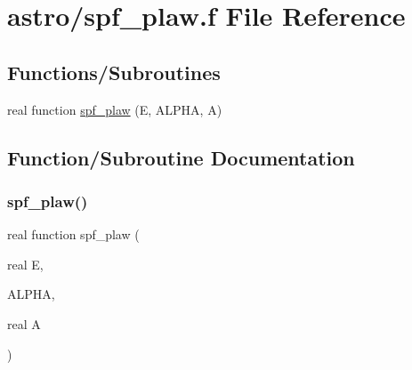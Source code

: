 \hypertarget{spf__plaw_8f}{}\section{astro/spf\+\_\+plaw.f File Reference}
\label{spf__plaw_8f}
\subsection*{Functions/\+Subroutines}
\begin{DoxyCompactItemize}
\item 
real function \hyperlink{spf__plaw_8f_af48b32cc8bd5f000ed2728818046e47d}{spf\+\_\+plaw} (E, A\+L\+P\+HA, A)
\end{DoxyCompactItemize}


\subsection{Function/\+Subroutine Documentation}
\mbox{\label{spf__plaw_8f_af48b32cc8bd5f000ed2728818046e47d}} 
\subsubsection{\texorpdfstring{spf\+\_\+plaw()}{spf\_plaw()}}
{\footnotesize\ttfamily real function spf\+\_\+plaw (\begin{DoxyParamCaption}\item[{real}]{E,  }\item[{}]{A\+L\+P\+HA,  }\item[{real}]{A }\end{DoxyParamCaption})}

